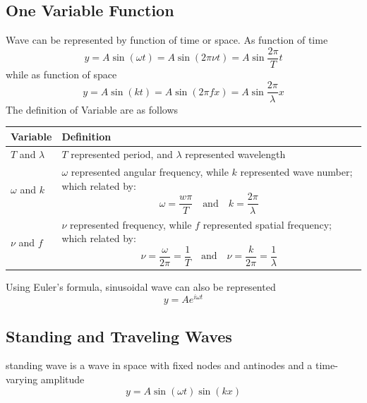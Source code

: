\documentclass[../../../main.tex]{subfiles}
\begin{document}
\subsection{One Variable Function}
Wave can be represented by function of time or space. As function of time
\begin{equation*}
    y = A \sin(\omega t) = A \sin(2\pi \nu t) =A\sin \frac{2\pi}{T}t
\end{equation*}
while as function of space
\begin{equation*}
    y = A \sin(k t) = A \sin(2\pi f x) =A\sin \frac{2\pi}{\lambda}x
\end{equation*}
The definition of Variable are as follows
\begin{center}
    \begin{longtable}{| p{} | p{} |}
        \hline Variable&Definition\\\hline\hline
        $T$ and $\lambda$&$T$ represented period, and $\lambda$ represented wavelength\\\hline
        $\omega$ and $k$&$\omega$ represented angular frequency, while $k$ represented wave number; which related by:\begin{equation*}
            \omega=\frac{w\pi}{T}\quad\text{and}\quad k=\frac{2\pi}{\lambda}
        \end{equation*}\\\hline
        $\nu$ and $f$&$\nu$ represented frequency, while $f$ represented spatial frequency; which related by:\begin{equation*}
            \nu=\frac{\omega}{2\pi}=\frac{1}{T}\quad 
            \text{and}
            \quad \nu=\frac{k}{2\pi}=\frac{1}{\lambda}
        \end{equation*}\\\hline
    \end{longtable}
\end{center}

Using Euler's formula, sinusoidal wave can also be represented
\begin{equation*}
    y=Ae^{i\omega t}
\end{equation*}

\subsection{Standing and Traveling Waves}
standing wave is a wave in space with fixed nodes and antinodes and a time-varying amplitude
\begin{equation*}
    y = A \sin(\omega t) \sin(kx)
\end{equation*}
\end{document}
